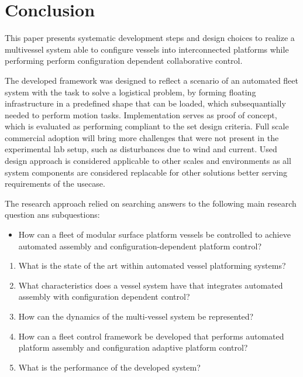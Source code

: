 \chapter{Conclusion}
\label{Conclusion}
This paper presents systematic development steps and design choices to realize a multivessel system able to configure vessels into interconnected platforms while performing perform configuration dependent collaborative control. 

The developed framework was designed to reflect a scenario of an automated fleet system with the task to solve a logistical problem, by forming floating infrastructure in a predefined shape that can be loaded, which subsequantially needed to perform motion tasks. Implementation serves as proof of concept, which is evaluated as performing compliant to the set design criteria. Full scale commercial adoption will bring more challenges that were not present in the experimental lab setup, such as disturbances due to wind and current.  Used design approach is considered applicable to other scales and environments as all system components are considered replacable for other solutions better serving requirements of the usecase.

The research approach relied on searching answers to the following main research question ans subquestions:

\begin{itemize}
	\item How can a fleet of modular surface platform vessels be controlled to achieve automated assembly and configuration-dependent platform control?
\end{itemize}
\begin{enumerate}
	\item What is the state of the art within automated vessel platforming systems?
	\item What characteristics does a vessel system have that integrates automated assembly with configuration dependent control?
	\item How can the dynamics of the multi-vessel system be represented?
	\item How can a fleet control framework be developed that performs automated platform assembly and configuration adaptive platform control? 
	\item What is the performance of the developed system?
\end{enumerate}

